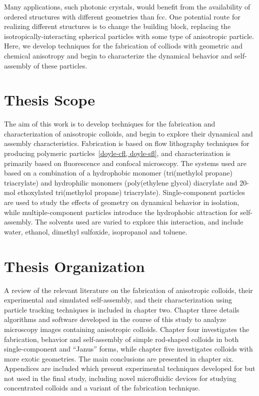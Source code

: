 Many applications, such photonic crystals, would benefit from the availability of ordered structures with different geometries
than fcc.  One potential route for realizing different structures is to change the building block, replacing the 
isotropically-interacting spherical particles with some type of anisotropic particle.  Here, we develop techniques for
the fabrication of colliods with geometric and chemical anisotropy and begin to characterize the dynamical behavior
and self-assembly of these particles.

\section{Thesis Scope}

The aim of this work is to develop techniques for the fabrication and characterization of anisotropic colloids, and begin
to explore their dynamical and assembly characteristics.  Fabrication is based on flow lithography
techniques for producing polymeric particles~\ref{doyle-cfl, doyle-sfl}, 
and characterization is primarily based on fluorescence and confocal microscopy.
The systems used are based on a combination of a hydrophobic monomer (tri(methylol propane) triacrylate) and hydrophilic 
monomers (poly(ethylene glycol) diacrylate and 20-mol ethoxylated tri(methylol propane) triacrylate). 
Single-component particles are used to study the effects of
geometry on dynamical behavior in isolation, while multiple-component particles introduce 
the hydrophobic attraction for self-assembly.  The solvents used are 
varied to explore this interaction, and include
water, ethanol, dimethyl sulfoxide, isopropanol and toluene.

\section{Thesis Organization}

A review of the relevant literature on the fabrication of anisotropic colloids, their experimental and simulated
self-assembly, and their characterization using particle tracking techniques is included in chapter two.  Chapter three
details algorithms and software developed in the course of this study to analyze microscopy images containing 
anisotropic colloids.  Chapter four investigates the fabrication, behavior and self-assembly of simple rod-shaped colloids
in both single-component and ``Janus'' forms, while chapter five investigates colloids with more exotic geometries. The main
conclusions are presented in chapter six.  Appendices are included which present experimental techniques developed for but not used
in the final study, including novel microfluidic devices for studying concentrated colloids and a variant of the fabrication
technique.
